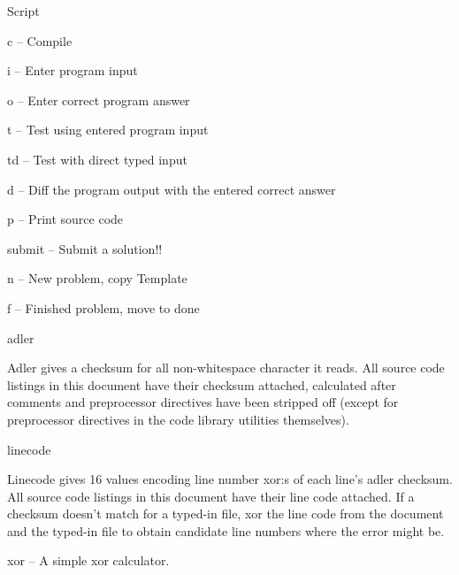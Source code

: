 \begin{algorithm}{Script}
  \begin{description}
  \item{c} -- Compile
  \item{i} -- Enter program input
  \item{o} -- Enter correct program answer
  \item{t} -- Test using entered program input
  \item{td} -- Test with direct typed input
  \item{d} -- Diff the program output with the entered correct answer
  \item{p} -- Print source code
  \item{submit} -- Submit a solution!!
  \item{n} -- New problem, copy Template
  \item{f} -- Finished problem, move to done
  \end{description}
\end{algorithm}


\begin{algorithm}{adler}

Adler gives a checksum for all non-whitespace character it reads.
All source code listings in this document have their checksum attached,
calculated after comments and preprocessor directives have been stripped off
(except for preprocessor directives in the code library utilities themselves).
\end{algorithm}

\begin{algorithm}{linecode}

Linecode gives 16 values encoding line number xor:s of each line's adler
checksum. All source code listings in this document have their line code
attached. If a checksum doesn't match for a typed-in file, xor the line code
from the document and the typed-in file to obtain candidate line numbers where
the error might be.
\end{algorithm}

\begin{algorithm}{xor}
-- A simple xor calculator.
\end{algorithm}

